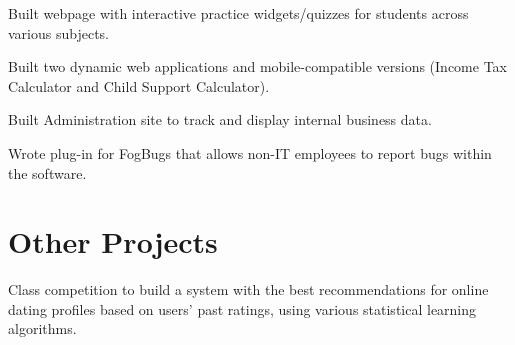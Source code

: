 \documentclass[letterpaper]{deedy-resume} %
\begin{document}
\begin{minipage}[t]{0.66\textwidth}


\begin{tightitemize}
\item Built webpage with interactive practice widgets/quizzes for students across various subjects.
\end{tightitemize}

\sectionspace %



\begin{tightitemize}
\item Built two dynamic web applications and mobile-compatible versions (Income Tax Calculator and Child Support Calculator).
\item Built Administration site to track and display internal business data.
\item Wrote plug-in for FogBugs that allows non-IT employees to report bugs within the software. 
\end{tightitemize}

\sectionspace %


\section{Other Projects}


Class competition to build a system with the best recommendations for online dating profiles based on users' past ratings, using various statistical learning algorithms.

\sectionspace %




\end{minipage}
\end{document}
